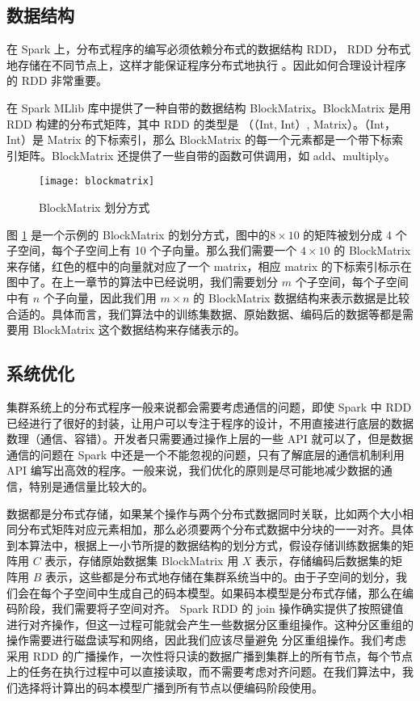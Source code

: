 \subsection{数据结构}
在 Spark 上，分布式程序的编写必须依赖分布式的数据结构 RDD， RDD 分布式地存储在不同节点上，这样才能保证程序分布式地执行 。因此如何合理设计程序的 RDD 非常重要。

在 Spark MLlib 库中提供了一种自带的数据结构 BlockMatrix。BlockMatrix 是用 RDD 构建的分布式矩阵，其中 RDD 的类型是 （（Int, Int）, Matrix）。（Int，Int）是 Matrix 的下标索引，那么 BlockMatrix 的每一个元素都是一个带下标索引矩阵。BlockMatrix 还提供了一些自带的函数可供调用，如 add、multiply。

\begin{figure}[H]
  \centering
  \texttt{[image: blockmatrix]}
  \caption{BlockMatrix 划分方式}
  \label{fig:blockmatrix}
\end{figure}

图 \ref{fig:blockmatrix} 是一个示例的 BlockMatrix 的划分方式，图中的$ 8\times 10$ 的矩阵被划分成 4 个子空间，每个子空间上有 10 个子向量。那么我们需要一个 $4\times 10$ 的 BlockMatrix 来存储，红色的框中的向量就对应了一个 matrix，相应 matrix 的下标索引标示在图中了。在上一章节的算法中已经说明，我们需要划分 $m$ 个子空间，每个子空间中有 $n$ 个子向量，因此我们用 $m\times n$ 的 BlockMatrix 数据结构来表示数据是比较合适的。具体而言，我们算法中的训练集数据、原始数据、编码后的数据等都是需要用 BlockMatrix 这个数据结构来存储表示的。
\subsection{系统优化}
集群系统上的分布式程序一般来说都会需要考虑通信的问题，即使 Spark 中 RDD 已经进行了很好的封装，让用户可以专注于程序的设计，不用直接进行底层的数据数理（通信、容错）。开发者只需要通过操作上层的一些 API 就可以了，但是数据通信的问题在 Spark 中还是一个不能忽视的问题，只有了解底层的通信机制利用 API 编写出高效的程序。一般来说，我们优化的原则是尽可能地减少数据的通信，特别是通信量比较大的。

数据都是分布式存储，如果某个操作与两个分布式数据同时关联，比如两个大小相同分布式矩阵对应元素相加，那么必须要两个分布式数据中分块的一一对齐。具体到本算法中，根据上一小节所提的数据结构的划分方式，假设存储训练数据集的矩阵用 $C$ 表示，存储原始数据集 BlockMatrix 用 $X$ 表示，存储编码后数据集的矩阵用 $B$ 表示，这些都是分布式地存储在集群系统当中的。由于子空间的划分，我们会在每个子空间中生成自己的码本模型。如果码本模型是分布式存储，那么在编码阶段，我们需要将子空间对齐。 Spark RDD 的 join 操作确实提供了按照键值进行对齐操作，但这一过程可能就会产生一些数据分区重组操作。这种分区重组的操作需要进行磁盘读写和网络，因此我们应该尽量避免 分区重组操作。我们考虑采用 RDD 的广播操作，一次性将只读的数据广播到集群上的所有节点，每个节点上的任务在执行过程中可以直接读取，而不需要考虑对齐问题。在我们算法中，我们选择将计算出的码本模型广播到所有节点以便编码阶段使用。

